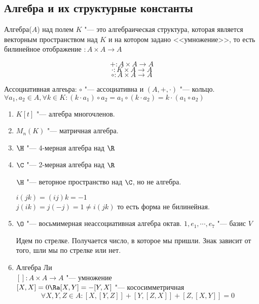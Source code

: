 \subsection{Алгебра и их структурные константы}
\begin{Def}
Алгебра($A$) над полем $K$ "--- это алгебраическая  структура, которая является векторным пространством
над $K$ и на котором задано <<умножение>>, то есть билинейное отображение $\colon A \times A \to A$

$$+ \colon A \times A \to A$$
$$\cdot \colon K \times A \to A$$
$$\circ \colon A \times A \to A$$

\end{Def}
\begin{Def}  \hfill
    Ассоциативная алгеьра: $\circ$ "--- ассоциативна и $(A, +, \cdot)$ "--- кольцо.\\ 
    $\forall a_1, a_2 \in A, \forall k \in K \colon (k \cdot a_1) \circ a_2 = a_1 \circ (k \cdot a_2) = k \cdot (a_1 \circ a_2)$\\
\end{Def}
\begin{exmp}\hfill
    \begin{enumerate}
    \item
    $K[t]$ "--- алгебра многочленов.\\
    \item
    $M_n(K)$ "--- матричная алгебра.\\
    \item
    $\H$ "--- 4-мерная алгебра над $\R$\\
    \item
    $\C$ "--- 2-мерная алгебра над $\R$\\
    \begin{Rem}
    $\H$ "--- веторное пространство над $\C$, но не алгебра. 

    $i(jk) = (ij) k = -1$\\
    $j(ik) = j(-j) = 1 \ne i(jk)$
     то есть форма не билинейная. 
    \end{Rem}
    \item
    $\O$ "--- восьмимерная неассоциативная алгебра октав. 
    $1, e_1, \cdots, e_7$ "--- базис $V$

        
    Идем по стрелке. Получается число, в которое мы пришли. Знак зависит от того, шли мы по стрелке или нет. 
    \item Алгебра Ли \\
    $[]\colon A \times A \to A $ "--- умножение\\
    $[X, X] = 0 \Ra [X, Y] = -[Y, X]$ "--- кососимметричная\\
    $$\forall X, Y, Z\in A \colon [X, [Y, Z]] + [Y, [Z, X]] + [Z, [X, Y]] = 0$$
    \end{enumerate}
\end{exmp}

